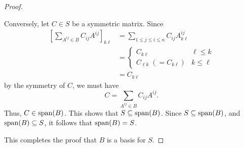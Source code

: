 \documentclass{homework}
\begin{document}
\begin{enumerate}
\begin{proof}
\begin{enumerate}[label=\arabic*.]
				Conversely, let $C \in S$ be a symmetric matrix. Since
				\begin{equation*}
					\begin{aligned}
					\left[\sum_{A^{ij} \in B}C_{ij}A^{ij}\right]_{k\ell} &= \sum_{1\le j\le i \le n}C_{ij}A^{ij}_{k\ell} \\
					&= \begin{cases}
						C_{k\ell} & \ell \le k \\
						C_{\ell k} \;(=C_{k\ell}) & k \le \ell
					\end{cases} \\
					&= C_{k\ell}
					\end{aligned}
				\end{equation*}
				by the symmetry of $C$, we must have
				\begin{equation*}
					C = \sum_{A^{ij}\in B}C_{ij}A^{ij}.
				\end{equation*}
				Thus, $C \in \mathrm{span}(B)$. This shows that $S\subseteq\mathrm{span}(B)$. Since $S\subseteq\mathrm{span}(B)$, and $\mathrm{span}(B) \subseteq S$, it follows that $\mathrm{span}(B) = S$.
			\end{enumerate}
			This completes the proof that $B$ is a basis for $S$.
		\end{proof}
	\end{enumerate}
	
\end{document}

